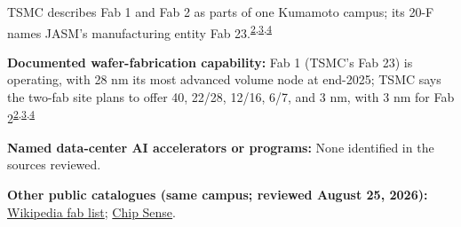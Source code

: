 \begin{minipage}[t][0.90\textheight][t]{\textwidth}
\begin{minipage}[t]{\textwidth}
\begin{minipage}[t]{0.32\textwidth}
\medskip
{\footnotesize TSMC describes Fab 1 and Fab 2 as parts of one Kumamoto campus; its 20-F names JASM's manufacturing entity Fab 23.\nobreak\textsuperscript{\href{\detokenize{https://pr.tsmc.com/english/news/3105}}{\textcolor{accent}{2}},\href{\detokenize{https://investor.tsmc.com/sites/ir/annual-report/2025/2025}\%\detokenize{20TSMC}\%\detokenize{20Annual}\%\detokenize{20Report.E.pdf}}{\textcolor{accent}{3}},\href{\detokenize{https://investor.tsmc.com/sites/ir/sec-filings/2025_20F}\%\detokenize{20Report.pdf}}{\textcolor{accent}{4}}}\par}
\medskip
{\footnotesize\textbf{Documented wafer-fabrication capability:} Fab 1 (TSMC's Fab 23) is operating, with 28 nm its most advanced volume node at end-2025; TSMC says the two-fab site plans to offer 40, 22/28, 12/16, 6/7, and 3 nm, with 3 nm for Fab 2\nobreak\textsuperscript{\href{\detokenize{https://pr.tsmc.com/english/news/3105}}{\textcolor{accent}{2}},\href{\detokenize{https://investor.tsmc.com/sites/ir/annual-report/2025/2025}\%\detokenize{20TSMC}\%\detokenize{20Annual}\%\detokenize{20Report.E.pdf}}{\textcolor{accent}{3}},\href{\detokenize{https://investor.tsmc.com/sites/ir/sec-filings/2025_20F}\%\detokenize{20Report.pdf}}{\textcolor{accent}{4}}}\par}
\end{minipage}
\end{minipage}
\par\vspace{0.65em}
\medskip
{\footnotesize\textbf{Named data-center AI accelerators or programs:} None identified in the sources reviewed.\par}
\smallskip
{\sffamily\scriptsize\color{black!62}\textbf{Other public catalogues (same campus; reviewed August 25, 2026):} \href{\detokenize{https://en.wikipedia.org/w/index.php?title=List_of_semiconductor_fabrication_plants&oldid=1370451124}\#\detokenize{Open_plants}}{Wikipedia fab list}; \href{\detokenize{https://github.com/aminalav/chip-sense/blob/93d22afe9e1309a7bebd6c7c96541f069f1d67ac/src/data/fab-sites.json}\#\detokenize{L23-L30}}{Chip Sense}.\par}
\medskip

\end{minipage}
